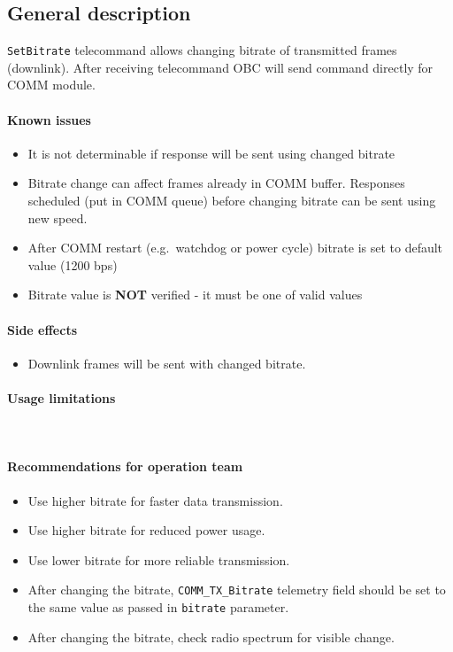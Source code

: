 

\subsection{General description}
\texttt{SetBitrate} telecommand allows changing bitrate of transmitted frames (downlink). After receiving telecommand OBC will send command directly for COMM module. 


\paragraph{Known issues}
\begin{itemize}
	\item It is not determinable if response will be sent using changed bitrate
	\item Bitrate change can affect frames already in COMM buffer. Responses scheduled (put in COMM queue) before changing bitrate can be sent using new speed.
	\item After COMM restart (e.g.\ watchdog or power cycle) bitrate is set to default value (1200 bps)
	\item Bitrate value is \textbf{NOT} verified - it must be one of valid values
\end{itemize}

\paragraph{Side effects}
\begin{itemize}
	\item Downlink frames will be sent with changed bitrate.
\end{itemize}

\paragraph{Usage limitations} \mbox{} \\
\None

\paragraph{Recommendations for operation team}
\begin{itemize}
	\item Use higher bitrate for faster data transmission.
	\item Use higher bitrate for reduced power usage.
	\item Use lower bitrate for more reliable transmission.
	\item After changing the bitrate, \texttt{COMM_TX_Bitrate} telemetry field should be set to the same value as passed in \texttt{bitrate} parameter.
	\item After changing the bitrate, check radio spectrum for visible change.
\end{itemize}

